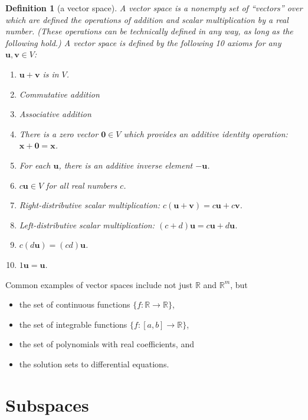 \documentclass[draft,12pt]{report}
\newtheorem{definition}{Definition}
\renewcommand{\vec}[1]{\mathbf{#1}}
\begin{document}
\begin{definition}[a vector space]
    A vector space is a nonempty set of ``vectors'' over which are defined the operations of addition and scalar multiplication by a real number. (These operations can be technically defined in any way, as long as the following hold.) A vector space is defined by the following 10 axioms for any $\vec{u}, \vec{v} \in V$:
    \begin{enumerate}
        \item $\vec{u} + \vec{v}$ is in $V$.
        \item Commutative addition
        \item Associative addition
        \item There is a zero vector $\vec{0} \in V$ which provides an additive identity operation: $\vec{x} + \vec{0} = \vec{x}$.
        \item For each $\vec{u}$, there is an additive inverse element $-\vec{u}$.
        \item $c\vec{u} \in V$ for all real numbers $c$.
        \item Right-distributive scalar multiplication: $c(\vec{u} + \vec{v}) = c\vec{u} + c\vec{v}$.
        \item Left-distributive scalar multiplication: $(c + d)\vec{u} = c\vec{u} + d\vec{u}$.
        \item $c(d\vec{u}) = (cd)\vec{u}$.
        \item $1\vec{u} = \vec{u}$.
    \end{enumerate}
\end{definition}
\noindent
Common examples of vector spaces include not just $\mathbb R$ and $\mathbb R^m$, but
\begin{itemize}
	\item the set of continuous functions $\{f : \mathbb R \rightarrow \mathbb R\}$,
	\item the set of integrable functions $\{f : [a, b] \rightarrow \mathbb R\}$,
	\item the set of polynomials with real coefficients, and
	\item the solution sets to differential equations.
\end{itemize}

\section{Subspaces}
\end{document}
